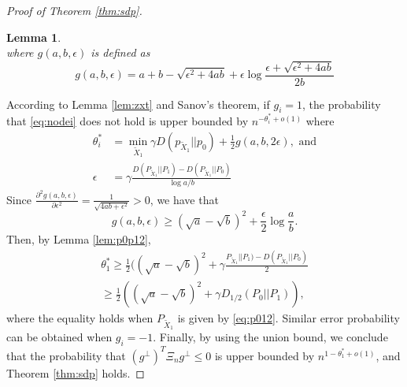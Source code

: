 \documentclass[conference]{IEEEtran}
\newtheorem{lemma}{Lemma}
\newtheorem{corollary}{Corollary}
\DeclareMathOperator{\SDP}{SDP}
\begin{document}
\begin{proof}[Proof of Theorem \ref{thm:sdp}]
\begin{lemma}
\begin{equation}
		\end{equation}
		where $g(a,b,\epsilon)$ is defined as
		\begin{equation}\label{eq:gab}
			g(a,b,\epsilon) = a + b - \sqrt{\epsilon^2 + 4ab} + \epsilon \log \frac{\epsilon + \sqrt{\epsilon^2 + 4ab}}{2b}
		\end{equation}
	\end{lemma}
	According to Lemma \ref{lem:zxt} and Sanov's theorem, if $g_i=1$, the probability that \eqref{eq:nodei} does not hold is upper bounded by
	$n^{-\theta^*_i + o(1)}$ where
	\begin{align}
		\theta^*_i &= \min_{\widetilde{X}_1} \gamma D(p_{\widetilde{X}_1}|| p_0)+ \frac{1}{2} g(a,b, 2\epsilon) \label{eq:theta_star2},\mbox{ and} \nonumber\\
		\epsilon &= \gamma \frac{D(P_{\widetilde{X}_1} || P_1) - D(P_{\widetilde{X}_1} || P_0) }{\log a /b}
	\end{align}
	Since $\frac{\partial^2 g(a,b,\epsilon)}{\partial \epsilon^2} =\frac{1}{\sqrt{4ab+\epsilon^2}}> 0$, we have that
	\begin{equation}\label{eq:g_linear}
		g(a,b,\epsilon) \geq  (\sqrt{a} - \sqrt{b})^2 + \frac{\epsilon}{2}\log \frac{a}{b}. 
	\end{equation}
	Then, by Lemma \ref{lem:p0p12},
	\begin{align*}
		\theta^*_1 \geq \frac{1}{2}((\sqrt{a}-\sqrt{b})^2+\gamma \frac{P_{\widetilde{X}_1} || P_1) - D(P_{\widetilde{X}_1} || P_0)}{2} \\
		\geq \frac{1}{2}((\sqrt{a}-\sqrt{b})^2+\gamma D_{1/2}(P_0||P_1)),
	\end{align*}
	where the equality holds when $P_{\widetilde{X}_1}$ is given by \eqref{eq:p012}. 
	Similar error probability can be obtained when $g_i=-1$. Finally,
	by using the union bound, we conclude that the probability that $(g^{\perp})^T \Xi_n g^{\perp}\le 0$ is upper bounded by $n^{1-\theta_1^*+o(1)}$, and Theorem \ref{thm:sdp} holds.
\end{proof}
\end{document}
